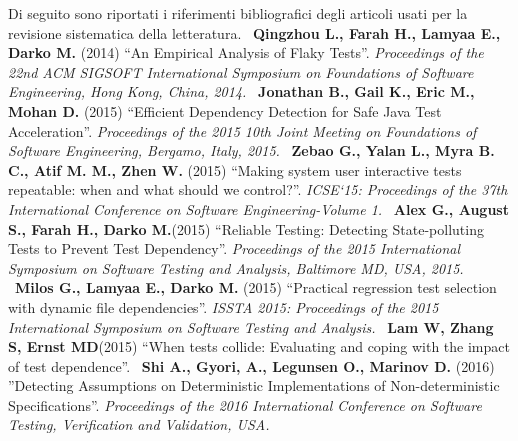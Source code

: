 \fancyhead[C]{}
Di seguito sono riportati i riferimenti bibliografici degli articoli usati per la
revisione sistematica della letteratura.
\newline~\newline
[S1] \textbf{Qingzhou L., Farah H., Lamyaa E., Darko M.} (2014) “An Empirical Analysis of Flaky Tests”. \emph{Proceedings of the 22nd ACM SIGSOFT International Symposium on Foundations of Software Engineering, Hong Kong, China, 2014.}
\newline~\newline
[S2] \textbf{Jonathan B., Gail K., Eric M., Mohan D.} (2015) “Efficient Dependency Detection for Safe Java Test Acceleration”. \emph{Proceedings of the 2015 10th Joint Meeting on Foundations of Software Engineering, Bergamo, Italy, 2015.}
\newline~\newline
[S3] \textbf{Zebao G., Yalan L., Myra B. C., Atif M. M., Zhen W.} (2015) “Making system user interactive tests repeatable: when and what should we control?”. \emph{ICSE‘15: Proceedings of the 37th International Conference on Software Engineering-Volume 1.}
\newline~\newline
[S4] \textbf{Alex G., August S., Farah H., Darko M.}(2015) “Reliable Testing: Detecting State-polluting Tests to Prevent Test Dependency”. \emph{Proceedings of the 2015 International Symposium on Software Testing and Analysis, Baltimore MD, USA, 2015.}
\newline~\newline
[S5] \textbf{Milos G., Lamyaa E., Darko M.} (2015) 
“Practical regression test selection with dynamic file dependencies”. \emph{ISSTA 2015: Proceedings of the 2015
International Symposium on Software Testing and Analysis.}
\newline~\newline
[S6] \textbf{Lam W, Zhang S, Ernst MD}(2015) “When tests collide: Evaluating and coping with the impact of test dependence”.
\newline~\newline
[S7] \textbf{Shi A., Gyori, A., Legunsen O., Marinov D.} (2016) ”Detecting Assumptions on Deterministic Implementations of Non-deterministic Specifications”.\emph{ Proceedings of the 2016 International Conference on Software Testing, Verification and Validation, USA.}
\newline~\newline
